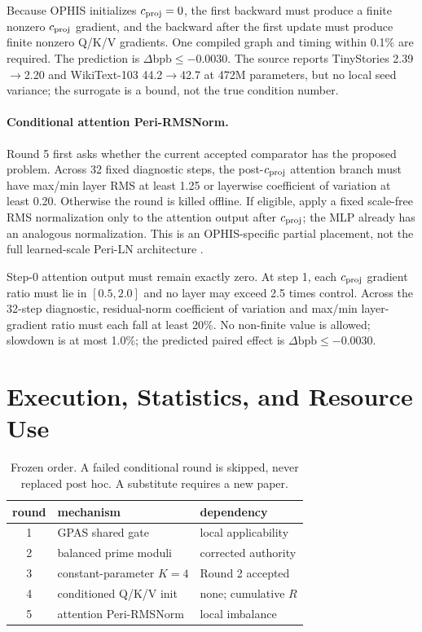 \documentclass{article}
\newcommand{\bpb}{\mathrm{bpb}}
\begin{document}
Because OPHIS initializes $c_{\rm proj}=0$, the first backward must produce a
finite nonzero $c_{\rm proj}$ gradient, and the backward after the first
update must produce finite nonzero Q/K/V gradients.  One compiled graph and
timing within 0.1\% are required.  The prediction is
$\Delta\bpb\le-0.0030$.  The source reports TinyStories
2.39$\rightarrow$2.20 and WikiText-103
44.2$\rightarrow$42.7 at 472M parameters, but no local seed variance; the
surrogate is a bound, not the true condition number.

\paragraph{Conditional attention Peri-RMSNorm.}
Round 5 first asks whether the current accepted comparator has the proposed
problem.  Across 32 fixed diagnostic steps, the post-$c_{\rm proj}$ attention
branch must have max/min layer RMS at least 1.25 or layerwise coefficient of
variation at least 0.20.  Otherwise the round is killed offline.  If eligible,
apply a fixed scale-free RMS normalization only to the attention output after
$c_{\rm proj}$; the MLP already has an analogous normalization.  This is an
OPHIS-specific partial placement, not the full learned-scale Peri-LN
architecture \cite{periln2025}.

Step-0 attention output must remain exactly zero.  At step 1, each
$c_{\rm proj}$ gradient ratio must lie in $[0.5,2.0]$ and no layer may exceed
2.5 times control.  Across the 32-step diagnostic, residual-norm coefficient
of variation and max/min layer-gradient ratio must each fall at least 20\%.
No non-finite value is allowed; slowdown is at most 1.0\%; the predicted
paired effect is $\Delta\bpb\le-0.0030$.

\section{Execution, Statistics, and Resource Use}

\begin{table}[t]
\caption{Frozen order.  A failed conditional round is skipped, never replaced
post hoc.  A substitute requires a new paper.}
\label{tab:order}
\centering\scriptsize
\setlength{\tabcolsep}{2.2pt}
\begin{tabular}{cll}
\toprule
round & mechanism & dependency\\
\midrule
1 & GPAS shared gate & local applicability\\
2 & balanced prime moduli & corrected authority\\
3 & constant-parameter $K=4$ & Round 2 accepted\\
4 & conditioned Q/K/V init & none; cumulative $R$\\
5 & attention Peri-RMSNorm & local imbalance\\
\bottomrule
\end{tabular}
\end{table}
\end{document}
